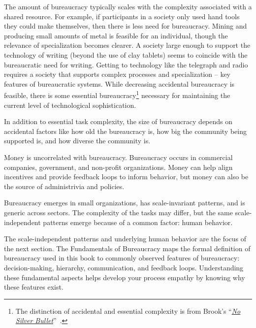 The amount of bureaucracy typically scales with the complexity associated with a shared resource. For example, if participants in a society only used hand tools they could make themselves, then there is less need for bureaucracy. Mining and producing small amounts of metal is feasible for an individual, though the relevance of specialization becomes clearer. A society large enough to support the technology of writing (beyond the use of clay tablets) seems to coincide with the bureaucratic need for writing. Getting to technology like the telegraph and radio requires a society that supports complex processes and specialization -- key features of bureaucratic systems. While decreasing accidental bureaucracy is feasible, there is some essential bureaucracy\footnote{The distinction of accidental and essential complexity is from Brook's 
``\href{https://en.wikipedia.org/wiki/No_Silver_Bullet\%23Summary}{\textit{No Silver Bullet}}''~\cite{1986_brooks}.}
necessary for maintaining the current level of technological sophistication. 

In addition to essential task complexity, the size of bureaucracy depends on accidental factors like how old the bureaucracy is, how big the community being supported is, and how diverse the community is.

Money is uncorrelated with bureaucracy. Bureaucracy occurs in commercial companies, government, and non-profit organizations. Money can help align incentives and provide feedback loops to inform behavior, but money can also be the source of administrivia and policies. 



Bureaucracy emerges in small organizations, has scale-invariant patterns, and is generic across sectors. The complexity of the tasks may differ, but the same scale-independent patterns emerge because of a common factor: human behavior. 

The scale-independent patterns and underlying human behavior are the focus of the next section. The Fundamentals of Bureaucracy maps the formal definition of bureaucracy used in this book to commonly observed features of bureaucracy: decision-making, hierarchy, communication, and feedback loops. Understanding these fundamental aspects helps develop your process empathy by knowing why these features exist. 

